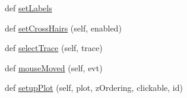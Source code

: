 \begin{DoxyCompactItemize}
\item 
def \hyperlink{classsoftware_1_1chipwhisperer_1_1common_1_1ui_1_1GraphWidget_1_1GraphWidget_ab16a75686268b50bd5cf79c335b78460}{set\+Labels}
\item 
def \hyperlink{classsoftware_1_1chipwhisperer_1_1common_1_1ui_1_1GraphWidget_1_1GraphWidget_a26b9199e7feb7a55adc797519e436c50}{set\+Cross\+Hairs} (self, enabled)
\item 
def \hyperlink{classsoftware_1_1chipwhisperer_1_1common_1_1ui_1_1GraphWidget_1_1GraphWidget_a7f6c930350d718e4da8a6c1ff783ba31}{select\+Trace} (self, trace)
\item 
def \hyperlink{classsoftware_1_1chipwhisperer_1_1common_1_1ui_1_1GraphWidget_1_1GraphWidget_a6ab9be58914948cef2e1a52188fa93f9}{mouse\+Moved} (self, evt)
\item 
def \hyperlink{classsoftware_1_1chipwhisperer_1_1common_1_1ui_1_1GraphWidget_1_1GraphWidget_ace82dd64dfb8448af79c01b75149dab9}{setup\+Plot} (self, plot, z\+Ordering, clickable, id)
\end{DoxyCompactItemize}
